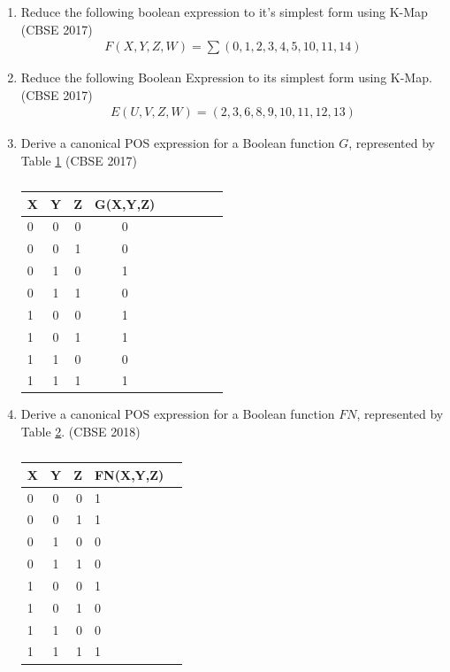 \begin{enumerate}[label=\arabic*.,ref=\theenumi]
	\item Reduce the following boolean expression to it's simplest form using K-Map
\hfill (CBSE 2017)
\label{prob:2017-1/c/6/d}
		\begin{align}
F(X,Y,Z,W) = \sum(0,1,2,3,4,5,10,11,14)
\label{eq:2017-1/c/6/d}
		\end{align}
	\item
		Reduce the following Boolean Expression to its simplest form using K-Map.
\hfill (CBSE 2017)
\label{prob:2017/c/6/d}
		\begin{align}
E(U,V,Z,W)=   (2 , 3 , 6 , 8 , 9 , 10 , 11 , 12 , 13 )
\label{eq:2017/c/6/d}
		\end{align}
	\item Derive a canonical POS expression for a Boolean function $G$, represented by Table 
\ref{tab:2017/c/6/c}
\label{prob:2017/c/6/c}
\hfill (CBSE 2017)
		\begin{table}[!ht]
 \begin{center}
    \begin{tabular}{|l|c|c|c|c|c|c|c|c|} \hline 
  \textbf{X}& \textbf{Y} & \textbf{Z} &\textbf{G(X,Y,Z)} \\
 \hline
 0&0&0&0\\ \hline
0&0&1&0 \\ \hline
0&1&0&1\\ \hline
0&1&1&0  \\ \hline
1&0&0&1\\ \hline
1&0&1&1\\ \hline
1&1&0&0\\ \hline
1&1&1&1\\ \hline
\end{tabular}   
\end{center}
\caption{}
\label{tab:2017/c/6/c}
\end{table}
\item Derive a canonical POS expression for a Boolean function $FN$, represented by Table 
\ref{tab:2018/c/6/c}.
\label{prob:2018/c/6/c}
\hfill (CBSE 2018)
		\begin{table}[!ht]
			\centering
\begin{tabular}{|l|c|r|l|c|}
    \hline %
      \textbf{X} & \textbf{Y} & \textbf{Z} & \textbf{FN(X,Y,Z)}\\
      \hline
      0 & 0 & 0 & 1\\
\hline
      0 & 0 & 1 & 1\\
\hline
      0 & 1 & 0 & 0\\
\hline
      0 & 1 & 1 & 0\\
\hline
      1 & 0 & 0 & 1\\
\hline
      1 & 0 & 1 & 0\\
\hline
      1 & 1 & 0 & 0\\
\hline
      1 & 1 & 1 & 1\\
      \hline      
   \end{tabular}
\caption{}
\label{tab:2018/c/6/c}
   \end{table}


\end{enumerate}
